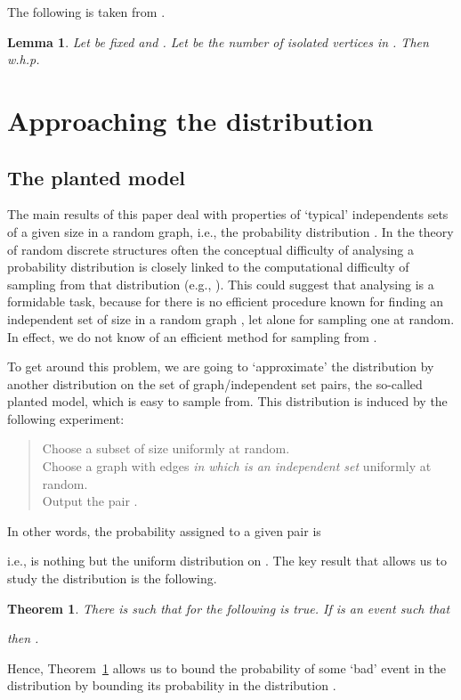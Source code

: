 \documentclass[a4paper,10pt]{article}
\newtheorem{lemma}{Lemma}\renewcommand{\thelemma}{\arabic{lemma}}
\newtheorem{theorem}{Theorem}\renewcommand{\thetheorem}{\arabic{theorem}}
\newcommand{\whp}{w.h.p.}
\newcommand\Thm{Theorem}
\begin{document}
\noindent
The following is taken from \cite[p.~156]{janson}.

\begin{lemma}\label{Lemma_isoGnm}
Let  be fixed and .
Let  be the number of isolated vertices in .
Then  \whp
\end{lemma}





\section{Approaching the distribution }\label{sec:PlantedModel}


\subsection{The planted model}

The main results of this paper deal with properties of `typical'
independents sets of a given size in a random graph, i.e., the
probability distribution . In the theory of random
discrete structures often the conceptual difficulty of analysing
a probability distribution is closely linked to the computational
difficulty of sampling from that distribution (e.g., \cite[Chapter~9]{janson}).
This could suggest that analysing  is a formidable task,
because for  there is no efficient procedure known
for finding an independent set of size  in a random graph ,
let alone for sampling one at random. In effect, we do not know of
an efficient method for sampling from .

To get around this problem, we are going to `approximate' the
distribution  by another distribution 
on the set  of graph/independent set pairs, the
so-called planted model, which is easy to sample from. This
distribution is induced by the following experiment:
\begin{quote}
Choose a subset  of size  uniformly at random.\\
Choose a graph  with  edges \emph{in which  is an
 independent set} uniformly at random.\\
Output the pair .
\end{quote}
In other words, the probability assigned to a given pair  is
	
i.e.,  is nothing but the uniform distribution on .
The key result that allows us to study the distribution  is the following.

\begin{theorem}\label{thrm:transfer-theorem}
There is  such that  for  the following is true.
If  is an event such that
	
then .
\end{theorem}
Hence, \Thm~\ref{thrm:transfer-theorem} allows us to bound the 
probability of some `bad' event  in the distribution 
by bounding its probability in the distribution .
\end{document}
